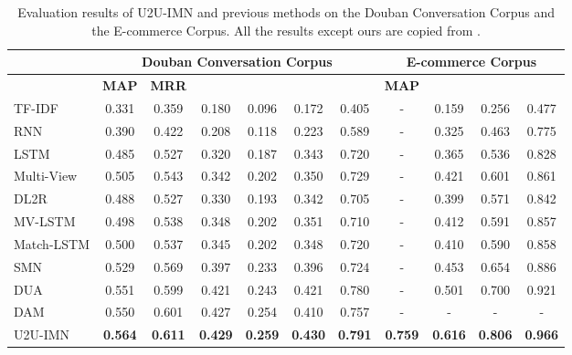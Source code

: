 \documentclass[journal]{IEEEtran}
\begin{document}
    \begin{table*}[!hbt]
     \small
     \caption{Evaluation results of U2U-IMN and previous methods on the Douban Conversation Corpus and the E-commerce Corpus. All the results except ours are copied from \cite{DBLP:conf/acl/WuWXZL17,DBLP:conf/coling/ZhangLZZL18,DBLP:conf/acl/WuLCZDYZL18}.}
     \label{tab4}
     \centering
     \begin{tabular}{l|c|c|c|c|c|c|c|c|c|c}
      \toprule
                             & \multicolumn{6}{c|}{Douban Conversation Corpus} & \multicolumn{4}{c}{E-commerce Corpus} \\
      \hline
                             & \textbf{MAP} & \textbf{MRR} &  &  &  &  & \textbf{MAP} &  &  &  \\
      \hline
       TF-IDF                & 0.331 & 0.359 & 0.180 & 0.096 & 0.172 & 0.405 &-& 0.159 & 0.256 & 0.477  \\
       RNN                   & 0.390 & 0.422 & 0.208 & 0.118 & 0.223 & 0.589 &-& 0.325 & 0.463 & 0.775  \\
       LSTM                  & 0.485 & 0.527 & 0.320 & 0.187 & 0.343 & 0.720 &-& 0.365 & 0.536 & 0.828  \\
       Multi-View            & 0.505 & 0.543 & 0.342 & 0.202 & 0.350 & 0.729 &-& 0.421 & 0.601 & 0.861  \\
       DL2R                  & 0.488 & 0.527 & 0.330 & 0.193 & 0.342 & 0.705 &-& 0.399 & 0.571 & 0.842  \\
       MV-LSTM               & 0.498 & 0.538 & 0.348 & 0.202 & 0.351 & 0.710 &-& 0.412 & 0.591 & 0.857  \\
       Match-LSTM            & 0.500 & 0.537 & 0.345 & 0.202 & 0.348 & 0.720 &-& 0.410 & 0.590 & 0.858  \\
      \hline
       SMN                   & 0.529 & 0.569 & 0.397 & 0.233 & 0.396 & 0.724 &-& 0.453 & 0.654 & 0.886  \\
       DUA                   & 0.551 & 0.599 & 0.421 & 0.243 & 0.421 & 0.780 &-& 0.501 & 0.700 & 0.921  \\
       DAM                   & 0.550 & 0.601 & 0.427 & 0.254 & 0.410 & 0.757 &-& -     & -     & -      \\
      \hline
      U2U-IMN                & \textbf{0.564} & \textbf{0.611} & \textbf{0.429} & \textbf{0.259} & \textbf{0.430} & \textbf{0.791}
                             & \textbf{0.759} & \textbf{0.616} & \textbf{0.806} & \textbf{0.966} \\
      \bottomrule
      \end{tabular}
    \end{table*}
\end{document}
